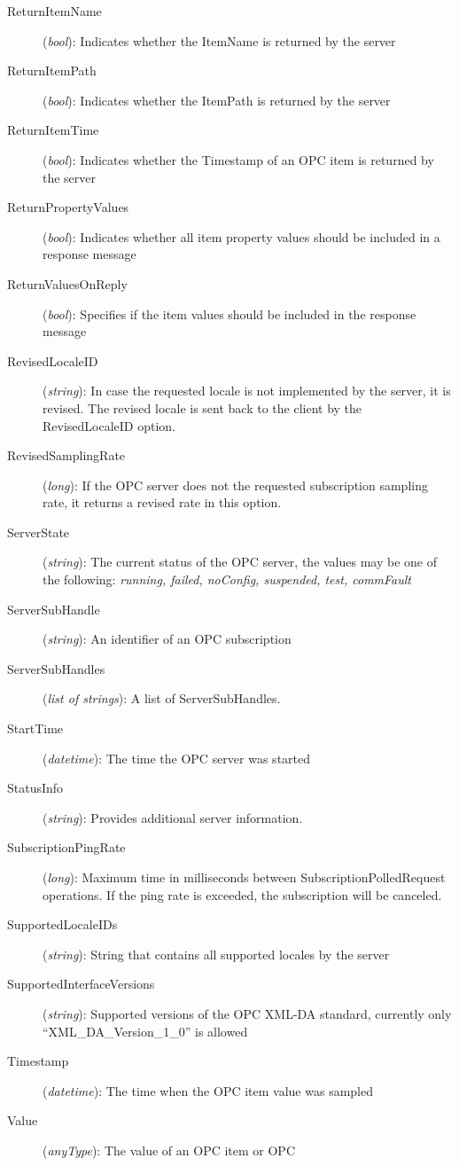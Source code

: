 \begin{description}
\item[ReturnItemName] ({\sl bool}): Indicates whether the ItemName
is returned by the server
\item[ReturnItemPath] ({\sl bool}): Indicates whether the ItemPath is
returned by the server
\item[ReturnItemTime] ({\sl bool}): Indicates whether the Timestamp of an
OPC item is returned by the server
\item[ReturnPropertyValues] ({\sl bool}): Indicates whether all item
property values should be included in a response message
\item[ReturnValuesOnReply] ({\sl bool}): Specifies if the item values
should be included in the response message
\item[RevisedLocaleID] ({\sl string}): In case the requested locale is not
implemented by the server, it is revised. The revised locale is sent back
to the client by the RevisedLocaleID option.
\item[RevisedSamplingRate] ({\sl long}): If the OPC server does not
the requested subscription sampling rate, it returns a revised rate in
this option.
\item[ServerState] ({\sl string}): The current status of the OPC
server, the values may be one of the following: {\sl running, failed,
noConfig, suspended, test, commFault}
\item[ServerSubHandle] ({\sl string}): An identifier of an OPC
subscription
\item[ServerSubHandles] ({\sl list of strings}): A list of
ServerSubHandles.
\item[StartTime] ({\sl datetime}): The time the OPC server was started
\item[StatusInfo] ({\sl string}): Provides additional server information.
\item[SubscriptionPingRate] ({\sl long}): Maximum time in milliseconds
between SubscriptionPolledRequest operations. If the ping rate is
exceeded, the subscription will be canceled.
\item[SupportedLocaleIDs] ({\sl string}): String that contains all
supported locales by the server
\item[SupportedInterfaceVersions] ({\sl string}): Supported versions
of the OPC XML-DA standard, currently only ``XML\_DA\_Version\_1\_0'' is
allowed
\item[Timestamp] ({\sl datetime}): The time when the OPC item value
was sampled
\item[Value] ({\sl anyType}): The value of an OPC item or OPC

\end{description}
